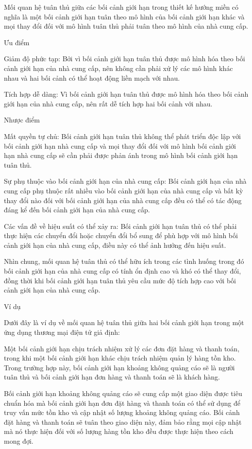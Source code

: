 Mối quan hệ tuân thủ giữa các bối cảnh giới hạn trong thiết kế hướng miền có nghĩa là một bối cảnh giới hạn tuân theo mô hình của bối cảnh giới hạn khác và mọi thay đổi đối với mô hình tuân thủ phải tuân theo mô hình của nhà cung cấp.

Ưu điểm

Giảm độ phức tạp: Bởi vì bối cảnh giới hạn tuân thủ được mô hình hóa theo bối cảnh giới hạn của nhà cung cấp, nên không cần phải xử lý các mô hình khác nhau và hai bối cảnh có thể hoạt động liền mạch với nhau.

Tích hợp dễ dàng: Vì bối cảnh giới hạn tuân thủ được mô hình hóa theo bối cảnh giới hạn của nhà cung cấp, nên rất dễ tích hợp hai bối cảnh với nhau.

Nhược điểm

Mất quyền tự chủ: Bối cảnh giới hạn tuân thủ không thể phát triển độc lập với bối cảnh giới hạn nhà cung cấp và mọi thay đổi đối với mô hình bối cảnh giới hạn nhà cung cấp sẽ cần phải được phản ánh trong mô hình bối cảnh giới hạn tuân thủ.

Sự phụ thuộc vào bối cảnh giới hạn của nhà cung cấp: Bối cảnh giới hạn của nhà cung cấp phụ thuộc rất nhiều vào bối cảnh giới hạn của nhà cung cấp và bất kỳ thay đổi nào đối với bối cảnh giới hạn của nhà cung cấp đều có thể có tác động đáng kể đến bối cảnh giới hạn của nhà cung cấp.

Các vấn đề về hiệu suất có thể xảy ra: Bối cảnh giới hạn tuân thủ có thể phải thực hiện các chuyển đổi hoặc chuyển đổi bổ sung để phù hợp với mô hình bối cảnh giới hạn của nhà cung cấp, điều này có thể ảnh hưởng đến hiệu suất.

Nhìn chung, mối quan hệ tuân thủ có thể hữu ích trong các tình huống trong đó bối cảnh giới hạn của nhà cung cấp có tính ổn định cao và khó có thể thay đổi, đồng thời khi bối cảnh giới hạn tuân thủ yêu cầu mức độ tích hợp cao với bối cảnh giới hạn của nhà cung cấp.

Ví dụ

Dưới đây là ví dụ về mối quan hệ tuân thủ giữa hai bối cảnh giới hạn trong một ứng dụng thương mại điện tử giả định:

Một bối cảnh giới hạn chịu trách nhiệm xử lý các đơn đặt hàng và thanh toán, trong khi một bối cảnh giới hạn khác chịu trách nhiệm quản lý hàng tồn kho. Trong trường hợp này, bối cảnh giới hạn khoảng không quảng cáo sẽ là người tuân thủ và bối cảnh giới hạn đơn hàng và thanh toán sẽ là khách hàng.

Bối cảnh giới hạn khoảng không quảng cáo sẽ cung cấp một giao diện được tiêu chuẩn hóa mà bối cảnh giới hạn đơn đặt hàng và thanh toán có thể sử dụng để truy vấn mức tồn kho và cập nhật số lượng khoảng không quảng cáo. Bối cảnh đặt hàng và thanh toán sẽ tuân theo giao diện này, đảm bảo rằng mọi cập nhật mà nó thực hiện đối với số lượng hàng tồn kho đều được thực hiện theo cách mong đợi.

